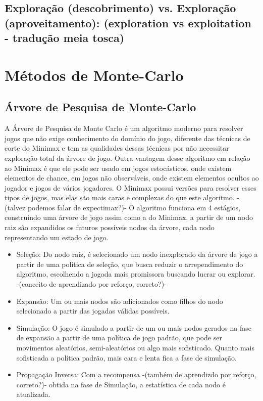 \subsection{\label{sec:secao3.3}Exploração (descobrimento) vs. Exploração (aproveitamento): 
(exploration vs exploitation - tradução meia tosca)}


\section{\label{sec:secao4}Métodos de Monte-Carlo}

\subsection{\label{sec:secao4.1}Árvore de Pesquisa de Monte-Carlo}

A Árvore de Pesquisa de Monte Carlo é um algoritmo moderno para resolver jogos que não exige conhecimento do domínio do jogo, diferente das técnicas de corte do Minimax e tem as qualidades dessas técnicas por não necessitar exploração total da árvore de jogo.
Outra vantagem desse algoritmo em relação ao Minimax é que ele pode ser usado em jogos estocásticos, onde existem elementos de chance, em jogos não observáveis, onde existem elementos ocultos ao jogador e jogos de vários jogadores. O Minimax possui versões para resolver esses tipos de jogos, mas elas são mais caras e complexas do que este algoritmo. -(talvez podemos falar de expectimax?)-
O algoritmo funciona em 4 estágios, construindo uma árvore de jogo assim como a do Minimax, a partir de um nodo raiz são expandidos os futuros possíveis nodos da árvore, cada nodo representando um estado de jogo.

\begin{itemize}

   \item Seleção: Do nodo raiz, é selecionado um nodo inexplorado da árvore de jogo a partir de uma politica de seleção, que busca reduzir o arrependimento do algoritmo, escolhendo a jogada mais promissora buscando lucrar ou explorar. -(conceito de aprendizado por reforço, 
   correto?)-
   
   \item Expansão: Um ou mais nodos são adicionados como filhos do nodo 
   selecionado a partir das jogadas válidas possíveis.
   
   \item Simulação: O jogo é simulado a partir de um ou mais nodos gerados na fase de expansão a partir de uma política de jogo padrão, que pode ser movimentos aleatórios, semi-aleatórios ou algo mais sofisticado. Quanto mais sofisticada a política padrão, mais cara e lenta fica a fase de simulação.
   
   \item Propagação Inversa: Com a recompensa -(também de aprendizdo por reforço, correto?)- obtida na fase de Simulação, a estatística de cada nodo é atualizada.
   
\end{itemize}

